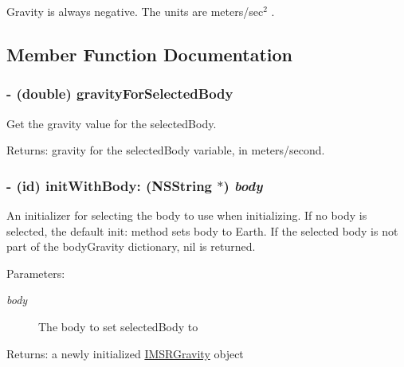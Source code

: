 Gravity is always negative. The units are meters/sec$^{\mbox{2}}$ . 

\subsection{Member Function Documentation}
\hypertarget{interface_i_m_s_r_gravity_12e427cd2462057b15f1ef74b6c5a535}{
\subsubsection[{gravityForSelectedBody}]{\setlength{\rightskip}{0pt plus 5cm}- (double) gravityForSelectedBody }}
\label{interface_i_m_s_r_gravity_12e427cd2462057b15f1ef74b6c5a535}


Get the gravity value for the selectedBody.

\begin{Desc}
\item[Returns:]gravity for the selectedBody variable, in meters/second. \end{Desc}
\hypertarget{interface_i_m_s_r_gravity_aae51c34df822f8f522828f802a3a80d}{
\subsubsection[{initWithBody:}]{\setlength{\rightskip}{0pt plus 5cm}- (id) initWithBody: (NSString $\ast$) {\em body}}}
\label{interface_i_m_s_r_gravity_aae51c34df822f8f522828f802a3a80d}


An initializer for selecting the body to use when initializing. If no body is selected, the default init: method sets body to Earth. If the selected body is not part of the bodyGravity dictionary, nil is returned.

\begin{Desc}
\item[Parameters:]
\begin{description}
\item[{\em body}]The body to set selectedBody to\end{description}
\end{Desc}
\begin{Desc}
\item[Returns:]a newly initialized \hyperlink{interface_i_m_s_r_gravity}{IMSRGravity} object \end{Desc}


